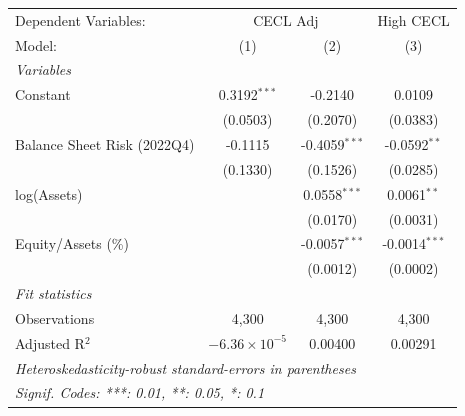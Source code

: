 
\begingroup
\centering
\begin{tabular}{lccc}
   \tabularnewline \midrule \midrule
   Dependent Variables: & \multicolumn{2}{c}{CECL Adj} & High CECL\\
   Model:                      & (1)                    & (2)             & (3)\\  
   \midrule
   \emph{Variables}\\
   Constant                    & 0.3192$^{***}$         & -0.2140         & 0.0109\\   
                               & (0.0503)               & (0.2070)        & (0.0383)\\   
   Balance Sheet Risk (2022Q4) & -0.1115                & -0.4059$^{***}$ & -0.0592$^{**}$\\   
                               & (0.1330)               & (0.1526)        & (0.0285)\\   
   log(Assets)                 &                        & 0.0558$^{***}$  & 0.0061$^{**}$\\   
                               &                        & (0.0170)        & (0.0031)\\   
   Equity/Assets (\%)          &                        & -0.0057$^{***}$ & -0.0014$^{***}$\\   
                               &                        & (0.0012)        & (0.0002)\\   
   \midrule
   \emph{Fit statistics}\\
   Observations                & 4,300                  & 4,300           & 4,300\\  
   Adjusted R$^2$              & $-6.36\times 10^{-5}$  & 0.00400         & 0.00291\\  
   \midrule \midrule
   \multicolumn{4}{l}{\emph{Heteroskedasticity-robust standard-errors in parentheses}}\\
   \multicolumn{4}{l}{\emph{Signif. Codes: ***: 0.01, **: 0.05, *: 0.1}}\\
\end{tabular}
\par\endgroup


